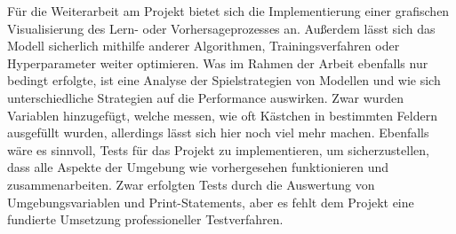 Für die Weiterarbeit am Projekt bietet sich die Implementierung einer grafischen Visualisierung des Lern- oder Vorhersageprozesses an. Außerdem lässt sich das Modell sicherlich mithilfe anderer Algorithmen, Trainingsverfahren oder Hyperparameter weiter optimieren. Was im Rahmen der Arbeit ebenfalls nur bedingt erfolgte, ist eine Analyse der Spielstrategien von Modellen und wie sich unterschiedliche Strategien auf die Performance auswirken. Zwar wurden Variablen hinzugefügt, welche messen, wie oft Kästchen in bestimmten Feldern ausgefüllt wurden, allerdings lässt sich hier noch viel mehr machen. Ebenfalls wäre es sinnvoll, Tests für das Projekt zu implementieren, um sicherzustellen, dass alle Aspekte der Umgebung wie vorhergesehen funktionieren und zusammenarbeiten. Zwar erfolgten Tests durch die Auswertung von Umgebungsvariablen und Print-Statements, aber es fehlt dem Projekt eine fundierte Umsetzung professioneller Testverfahren.